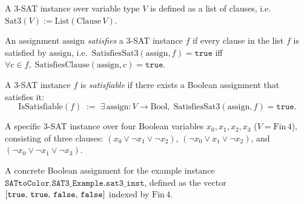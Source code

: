 \begin{definition}
\label{SATtoColor.Sat3}
\leanok
{}
A 3-SAT instance over variable type $V$ is defined as a list of clauses,
i.e.\ $\mathrm{Sat3}(V) := \mathrm{List}(\mathrm{Clause}\,V)$.
\end{definition}

\begin{definition}
\label{SATtoColor.SatisfiesSat3}
\leanok
{}
An assignment $\mathrm{assign}$ \emph{satisfies} a 3-SAT instance $f$ if every
clause in the list $f$ is satisfied by $\mathrm{assign}$, i.e.\
$\mathrm{SatisfiesSat3}(\mathrm{assign}, f) = \texttt{true}$ iff
$\forall c \in f,\; \mathrm{SatisfiesClause}(\mathrm{assign}, c) = \texttt{true}$.
\end{definition}

\begin{definition}[Satisfiability]
\label{SATtoColor.IsSatisfiable}
\leanok
{}
A 3-SAT instance $f$ is \emph{satisfiable} if there exists a Boolean
assignment that satisfies it:
\[
  \mathrm{IsSatisfiable}(f)
  \;:=\;
  \exists\,\mathrm{assign}: V \to \mathrm{Bool},\;
  \mathrm{SatisfiesSat3}(\mathrm{assign}, f) = \texttt{true}.
\]
\end{definition}

\begin{definition}
\label{SATtoColor.SAT3_Example.sat3_inst}
\leanok
{}
A specific 3-SAT instance over four Boolean variables $x_0, x_1, x_2, x_3$
($V = \mathrm{Fin}\,4$), consisting of three clauses:
$(x_0 \vee \neg x_1 \vee \neg x_2)$,
$(\neg x_0 \vee x_1 \vee \neg x_2)$, and
$(\neg x_0 \vee \neg x_1 \vee \neg x_3)$.
\end{definition}

\begin{definition}
\label{SATtoColor.SAT3_Example.ex_assign_1}
\leanok
A concrete Boolean assignment for the example instance
$\texttt{SATtoColor.SAT3\_Example.sat3\_inst}$, defined as the vector
$[{\tt true},\,{\tt true},\,{\tt false},\,{\tt false}]$ indexed by
$\mathrm{Fin}\,4$.
\end{definition}

